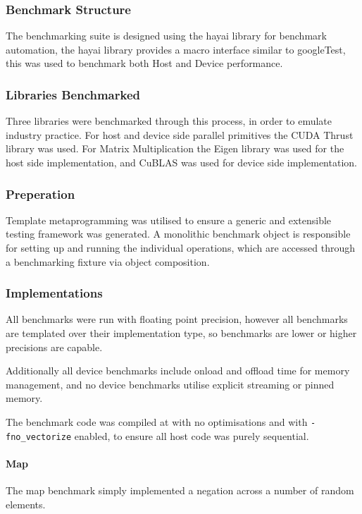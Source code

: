 \subsubsection{Benchmark Structure}
The benchmarking suite is designed using the hayai\cite{hayai} library for benchmark automation,
the hayai library provides a macro interface similar to googleTest, this was used to benchmark both
Host and Device performance.

\subsubsection{Libraries Benchmarked}
Three libraries were benchmarked through this process, in order to emulate industry practice. For
host and device side parallel primitives the CUDA Thrust\cite{thrust} library was used. For Matrix
Multiplication the Eigen\cite{eigen} library was used for the host side implementation, and
CuBLAS\cite{cublas} was used for device side implementation.

\subsubsection{Preperation}
Template metaprogramming was utilised to ensure a generic and extensible testing framework was
generated. A monolithic benchmark object is responsible for setting up and running the individual
operations, which are accessed through a benchmarking fixture via object composition.

\subsubsection{Implementations}
All benchmarks were run with floating point precision, however all benchmarks are templated over
their implementation type, so benchmarks are lower or higher precisions are capable.

Additionally all device benchmarks include onload and offload time for memory management, and no
device benchmarks utilise explicit streaming or pinned memory.

The benchmark code was compiled at with no optimisations and with \lstinline{-fno_vectorize} enabled, to ensure
all host code was purely sequential.
\paragraph{Map}
The map benchmark simply implemented a negation across a number of random elements.

